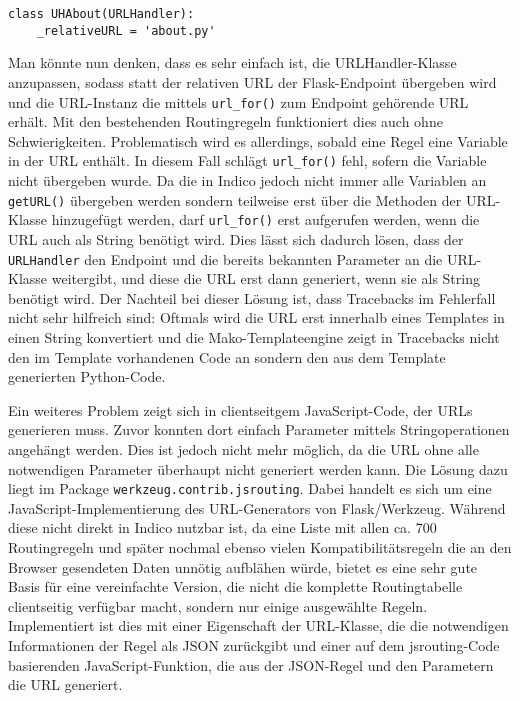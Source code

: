 \begin{lstlisting}[caption=URLHandler für about.py]
class UHAbout(URLHandler):
    _relativeURL = 'about.py'
\end{lstlisting}

Man könnte nun denken, dass es sehr einfach ist, die URLHandler-Klasse anzupassen, sodass statt der
relativen URL der Flask-Endpoint übergeben wird und die URL-Instanz die mittels
\lstinline{url_for()} zum Endpoint gehörende URL erhält. Mit den bestehenden Routingregeln
funktioniert dies auch ohne Schwierigkeiten. Problematisch wird es allerdings, sobald eine Regel eine
Variable in der URL enthält. In diesem Fall schlägt \lstinline{url_for()} fehl, sofern die Variable
nicht übergeben wurde. Da die in Indico jedoch nicht immer alle Variablen an \lstinline{getURL()}
übergeben werden sondern teilweise erst über die Methoden der URL-Klasse hinzugefügt werden, darf
\lstinline{url_for()} erst aufgerufen werden, wenn die URL auch als String benötigt wird. Dies lässt
sich dadurch lösen, dass der \lstinline{URLHandler} den Endpoint und die bereits bekannten Parameter
an die URL-Klasse weitergibt, und diese die URL erst dann generiert, wenn sie als String benötigt
wird. Der Nachteil bei dieser Lösung ist, dass Tracebacks im Fehlerfall nicht sehr hilfreich sind:
Oftmals wird die URL erst innerhalb eines Templates in einen String konvertiert und die
Mako-Templateengine zeigt in Tracebacks nicht den im Template vorhandenen Code an sondern den aus
dem Template generierten Python-Code.

Ein weiteres Problem zeigt sich in clientseitgem JavaScript-Code, der URLs generieren muss. Zuvor
konnten dort einfach Parameter mittels Stringoperationen angehängt werden. Dies ist jedoch
nicht mehr möglich, da die URL ohne alle notwendigen Parameter überhaupt nicht generiert werden
kann. Die Lösung dazu liegt im Package \lstinline{werkzeug.contrib.jsrouting}. Dabei handelt es sich
um eine JavaScript-Implementierung des URL-Generators von Flask/Werkzeug. Während diese nicht direkt
in Indico nutzbar ist, da eine Liste mit allen ca. 700 Routingregeln und später nochmal ebenso vielen
Kompatibilitätsregeln die an den Browser gesendeten Daten unnötig aufblähen würde, bietet es eine
sehr gute Basis für eine vereinfachte Version, die nicht die komplette Routingtabelle clientseitig
verfügbar macht, sondern nur einige ausgewählte Regeln. Implementiert ist dies mit einer Eigenschaft
der URL-Klasse, die die notwendigen Informationen der Regel als JSON zurückgibt und einer auf dem
jsrouting-Code basierenden JavaScript-Funktion, die aus der JSON-Regel und den Parametern die URL
generiert.

